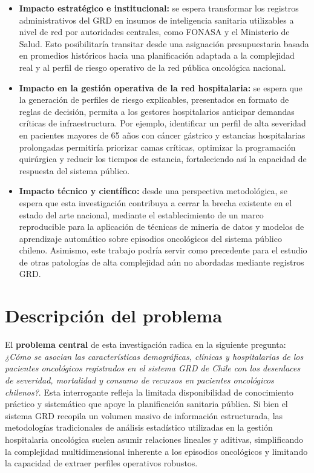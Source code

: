 \begin{itemize}
	\item \textbf{Impacto estratégico e institucional:} se espera transformar los registros administrativos del GRD en insumos de inteligencia sanitaria utilizables a nivel de red por autoridades centrales, como FONASA y el Ministerio de Salud. Esto posibilitaría transitar desde una asignación presupuestaria basada en promedios históricos hacia una planificación adaptada a la complejidad real y al perfil de riesgo operativo de la red pública oncológica nacional.
	\item \textbf{Impacto en la gestión operativa de la red hospitalaria:} se espera que la generación de perfiles de riesgo explicables, presentados en formato de reglas de decisión, permita a los gestores hospitalarios anticipar demandas críticas de infraestructura. Por ejemplo, identificar un perfil de alta severidad en pacientes mayores de 65 años con cáncer gástrico y estancias hospitalarias prolongadas permitiría priorizar camas críticas, optimizar la programación quirúrgica y reducir los tiempos de estancia, fortaleciendo así la capacidad de respuesta del sistema público.
	\item \textbf{Impacto técnico y científico:} desde una perspectiva metodológica, se espera que esta investigación contribuya a cerrar la brecha existente en el estado del arte nacional, mediante el establecimiento de un marco reproducible para la aplicación de técnicas de minería de datos y modelos de aprendizaje automático sobre episodios oncológicos del sistema público chileno. Asimismo, este trabajo podría servir como precedente para el estudio de otras patologías de alta complejidad aún no abordadas mediante registros GRD.
\end{itemize}

\section{Descripci\'on del problema}
\label{intro:problema}
El \textbf{problema central} de esta investigación radica en la siguiente pregunta: \textit{¿Cómo se asocian las características demográficas, clínicas y hospitalarias de los pacientes oncológicos registrados en el sistema GRD de Chile con los desenlaces de severidad, mortalidad y consumo de recursos en pacientes oncológicos chilenos?}. Esta interrogante refleja la limitada disponibilidad de conocimiento práctico y sistemático que apoye la planificación sanitaria pública. Si bien el sistema GRD recopila un volumen masivo de información estructurada, las metodologías tradicionales de análisis estadístico utilizadas en la gestión hospitalaria oncológica suelen asumir relaciones lineales y aditivas, simplificando la complejidad multidimensional inherente a los episodios oncológicos y limitando la capacidad de extraer perfiles operativos robustos.

